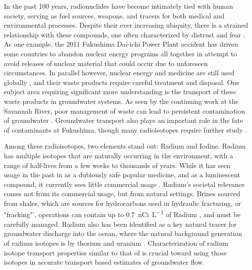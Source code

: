 \documentclass[twoside,12pt,titlepage]{article}
\newcommand{\isotope}[2]{\ch{^{#1}#2}}
\begin{document}
In the past 100 years, radionuclides have become intimately tied with human society, serving as fuel sources, weapons, and tracers for both medical and environmental processes. Despite their ever increasing ubiquity, there is a strained relationship with these compounds, one often characterized by distrust and fear \cite{Hohenemser1977}. As one example, the 2011 Fukushima Dai-ichi Power Plant accident has driven some countries to abandon nuclear energy programs all together in attempt to avoid releases of nuclear material that could occur due to unforeseen circumstances. In parallel however, nuclear energy and medicine are still used globally \cite{Ramana2013}, and their waste products require careful treatment and disposal. One subject area requiring significant more understanding is the transport of these waste products in groundwater systems. As seen by the continuing work at the Savannah River, poor management of waste can lead to persistent contamination of groundwater \cite{Emerson2014}. Groundwater transport also plays an important role in the fate of contaminants at Fukushima, though many radioisotopes require further study \cite{Steinhauser2014}.
\par Among these radioisotopes, two elements stand out: Radium and Iodine. Radium has multiple isotopes that are naturally occurring in the environment, with a range of half-lives from a few weeks to thousands of years. While it has seen usage in the past in as a dubiously safe popular medicine, and as a luminescent compound, it currently sees little commercial usage \cite{WikiRadium}. Radium’s societal relevance comes not from its commercial usage, but from natural settings. Brines sourced from shales, which are sources for hydrocarbons used in hydraulic fracturing, or "fracking"', operations can contain up to \SI{0.7}{\nano Ci\per\liter} of Radium \cite{Barbot2013}, and must be carefully managed. Radium also has been identified as a key natural tracer for groundwater discharge into the ocean, where the natural background generation of radium isotopes is by thorium and uranium \cite{Moore2000}. Characterization of radium isotope transport properties similar to that of \isotope{137}{Cs} \cite{Steinhauser2014} is crucial toward using those isotopes in accurate transport based estimates of groundwater flow. 
\end{document}
